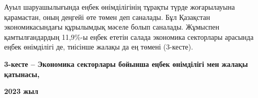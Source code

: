 {{Ауыл шаруашылығында еңбек өнімділігінің тұрақты түрде жоғарылауына
қарамастан, оның деңгейі өте төмен деп саналады. Бұл Қазақстан
экономикасындағы құрылымдық мәселе болып саналады. Жұмыспен
қамтылғандардың 11,9\%-ы еңбек ететін салада экономика секторлары
арасында еңбек өнімділігі де, тиісінше жалақы да ең төмені (3-кесте).

{\bfseries 3-кесте -- Экономика секторлары бойынша еңбек өнімділігі мен
жалақы қатынасы,}

{\bfseries 2023 жыл}

% 
% 
% 
% 
% 
}}
